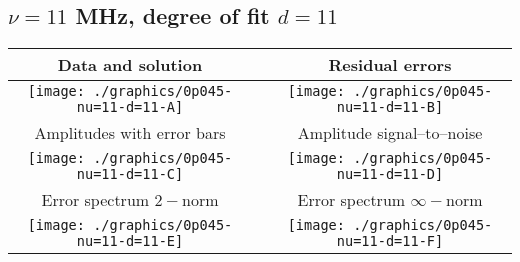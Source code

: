 

% 

\clearpage{}
\break{}

\subsection{$\nu = 11$ MHz, degree of fit $d = 11$}

\begin{table}[h]
    \begin{center}
        \begin{tabular}{ccc}
            Data and solution & \quad & Residual errors \\\hline
            \texttt{[image: ./graphics/0p045-nu=11-d=11-A]} &&
            \texttt{[image: ./graphics/0p045-nu=11-d=11-B]} \\[15pt]
            Amplitudes with error bars && Amplitude signal--to--noise \\\hline
            \texttt{[image: ./graphics/0p045-nu=11-d=11-C]} &&
            \texttt{[image: ./graphics/0p045-nu=11-d=11-D]} \\[15pt]
            Error spectrum $2-$norm && Error spectrum $\infty-$norm \\\hline
            \texttt{[image: ./graphics/0p045-nu=11-d=11-E]} &&
            \texttt{[image: ./graphics/0p045-nu=11-d=11-F]} \\[15pt]
        \end{tabular}
    \end{center}
\label{fig:elev=45, nu=11}
\end{table}



\endinput
